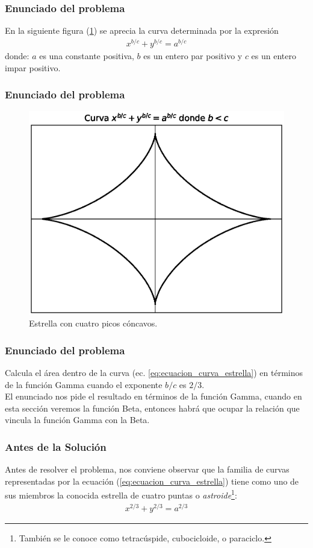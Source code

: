\begin{frame}
\frametitle{Enunciado del problema}
En la siguiente figura (\ref{fig:figura_curva_estrella}) se aprecia la curva determinada por la expresión
\begin{align}
x^{b/c} + y^{b/c} = a^{b/c}
\label{eq:ecuacion_curva_estrella}
\end{align}
donde: $a$ es una constante positiva, $b$ es un entero par positivo y $c$ es un entero impar positivo.
\end{frame}
\begin{frame}
\frametitle{Enunciado del problema}
\begin{figure}[H]
    \centering
    \includegraphics[scale=0.5]{Imagenes/plot_curva_estrella_01.eps}
    \caption{Estrella con cuatro picos cóncavos.}
    \label{fig:figura_curva_estrella}
\end{figure}
\end{frame}
\begin{frame}
\frametitle{Enunciado del problema}
Calcula el área dentro de la curva (ec. \ref{eq:ecuacion_curva_estrella}) en términos de la función Gamma cuando el exponente $b/c$ es $2/3$.
\\
\bigskip
\pause
El enunciado nos pide el resultado en términos de la función Gamma, cuando en esta sección veremos la función Beta\pause, entonces habrá que ocupar la relación que vincula la función Gamma con la Beta.
\end{frame}
\begin{frame}
\frametitle{Antes de la Solución}
Antes de resolver el problema, nos conviene observar que la familia de curvas representadas por la ecuación (\ref{eq:ecuacion_curva_estrella}) tiene como uno de sus miembros la conocida estrella de cuatro puntas o \emph{astroide}\footnote{También se le conoce como tetracúspide, cubocicloide, o paraciclo.}:
\begin{align*}
x^{2/3} + y^{2/3} = a^{2/3}
\end{align*}
\end{frame}
